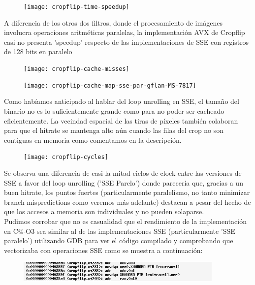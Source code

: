 \begin{figure}[h]
\centering
\texttt{[image: cropflip-time-speedup]} 
\label{fig:cropflip-time-speedup}
\end{figure}

A diferencia de los otros dos filtros, donde el procesamiento de imágenes involucra operaciones aritméticas paralelas, la implementación AVX de	 Cropflip casi no presenta 'speedup' respecto de las implementaciones de SSE con registros de 128 bits en paralelo 

\begin{figure}[H]
\centering
\texttt{[image: cropflip-cache-misses]}
\label{fig:cropflip-cache-misses}
\end{figure}

\begin{figure}[H]
\centering
\texttt{[image: cropflip-cache-map-sse-par-gflan-MS-7817]}
\label{fig:cropflip-cache-map-sse_par-gflan-MS-7817}
\end{figure}
 

Como habíamos anticipado al hablar del loop unrolling en SSE, el tamaño del binario no es lo suficientemente grande como para no poder ser cacheado eficientemente. La vecindad espacial de las tiras de píxeles también colaboran para que el hitrate se mantenga alto aún cuando las filas del crop no son contiguas en memoria como comentamos en la descripción. 

\begin{figure}[h]
\centering
\texttt{[image: cropflip-cycles]} 
\label{fig:cropflip-cycles}
\end{figure}



Se observa una diferencia de casi la mitad ciclos de clock entre las versiones de SSE a favor del loop unrolling ('SSE Parelo') donde parecería que, gracias a un buen hitrate, los puntos fuertes  (particularmente paralelismo, no tanto minimizar branch mispredictions como veremos más adelante) destacan a pesar del hecho de que los accesos a memoria son individuales y no pueden solaparse.
\\

Pudimos corrobar que no es casualidad que el rendimiento de la implementación en C@-O3 sea similar al de las implementaciones SSE (particularmente 'SSE paralelo') utilizando GDB para ver el código compilado y comprobando que vectorizaba con operaciones SSE como se muestra a continuación:

\begin{figure}[H]
\centering
\includegraphics[width=0.90\textwidth]{untitled}
\end{figure}


